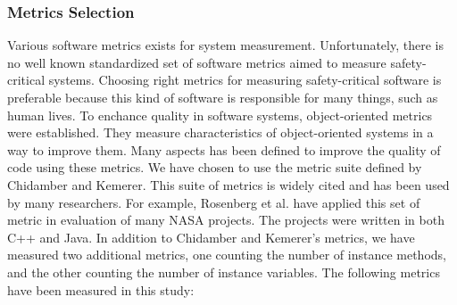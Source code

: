 \subsubsection{Metrics Selection}
Various software metrics exists for system measurement. Unfortunately, there is no well known standardized set of software metrics aimed to measure safety-critical systems. Choosing right metrics for measuring safety-critical software is preferable because this kind of software is responsible for many things, such as human lives. To enchance quality in software systems, object-oriented metrics were established. They measure characteristics of object-oriented systems in a way to improve them. Many aspects has been defined to improve the quality of code using these metrics. We have chosen to use the metric suite defined by Chidamber and Kemerer\cite{chidamber1994metrics}. This suite of metrics is widely cited and has been used by many researchers. For example, Rosenberg et al.\cite{rosenberg1999risk} have applied this set of metric in evaluation of many NASA projects. The projects were written in both C++ and Java. In addition to Chidamber and Kemerer's metrics, we have measured two additional metrics, one counting the number of instance methods, and the other counting the number of instance variables. The following metrics have been measured in this study:


